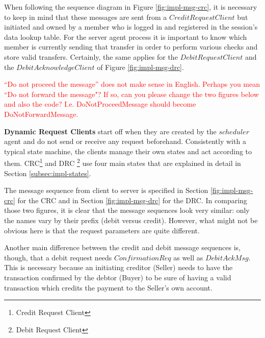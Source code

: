 When following the sequence diagram in Figure \ref{fig:impl-msg-crc}, it is necessary to keep in mind that these messages are sent from a $CreditRequestClient$ but initiated and owned by a member who is logged in and registered in the session's data lookup table. For the server agent process it is important to know which member is currently sending that transfer in order to perform various checks and store valid transfers. Certainly, the same applies for the $DebitRequestClient$ and the $DebitAcknowledgeClient$ of Figure \ref{fig:impl-msg-drc}.

\textcolor{red}{``Do not proceed the message'' does not make sense in English. Perhaps you mean ``Do not forward the message"? If so, can you please change the two figures below and also the code? I.e. DoNotProceedMessage should become DoNotForwardMessage.}



\textbf{Dynamic Request Clients} start off when they are created by the $scheduler$ agent and do not send or receive any request beforehand. Consistently with a typical state machine, the clients manage their own states and act according to them. CRC\footnote{Credit Request Client} and DRC \footnote{Debit Request Client} use four main states that are explained in detail in Section \ref{subsec:impl-states}.

The message sequence from client to server is specified in Section \ref{fig:impl-msg-crc} for the CRC and in Section \ref{fig:impl-msg-drc} for the DRC. In comparing those two figures, it is clear that the message sequences look very similar: only the names vary by their prefix (debit versus credit). However, what might not be obvious here is that the request parameters are quite different.

Another main difference between the credit and debit message sequences is, though, that a debit request needs $ConfirmationReq$ as well as $DebitAckMsg$. This is necessary because an initiating creditor (Seller) needs to have the transaction confirmed by the debtor (Buyer) to be sure of having a valid transaction which credits the payment to the Seller's own account.


